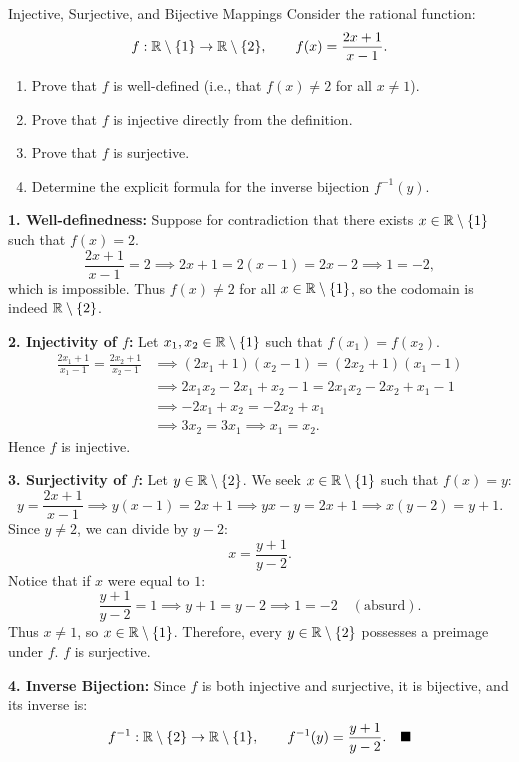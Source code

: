 \begin{exercise}{Injective, Surjective, and Bijective Mappings}
Consider the rational function:
\[
f: \mathbb{R} \setminus \{1\} \to \mathbb{R} \setminus \{2\}, \qquad f(x) = \frac{2x + 1}{x - 1}.
\]
\begin{enumerate}[leftmargin=1.5em,itemsep=2pt]
  \item Prove that $f$ is well-defined (i.e., that $f(x) \ne 2$ for all $x \ne 1$).
  \item Prove that $f$ is injective directly from the definition.
  \item Prove that $f$ is surjective.
  \item Determine the explicit formula for the inverse bijection $f^{-1}(y)$.
\end{enumerate}
\end{exercise}

\begin{tabletworkspace}[5.0cm]
\end{tabletworkspace}

\begin{solution}
\textbf{1. Well-definedness:}
Suppose for contradiction that there exists $x \in \mathbb{R} \setminus \{1\}$ such that $f(x) = 2$.
\[
\frac{2x + 1}{x - 1} = 2 \implies 2x + 1 = 2(x - 1) = 2x - 2 \implies 1 = -2,
\]
which is impossible. Thus $f(x) \ne 2$ for all $x \in \mathbb{R} \setminus \{1\}$, so the codomain is indeed $\mathbb{R} \setminus \{2\}$.

\textbf{2. Injectivity of $f$:}
Let $x_1, x_2 \in \mathbb{R} \setminus \{1\}$ such that $f(x_1) = f(x_2)$.
\begin{align*}
\frac{2x_1 + 1}{x_1 - 1} = \frac{2x_2 + 1}{x_2 - 1} &\implies (2x_1 + 1)(x_2 - 1) = (2x_2 + 1)(x_1 - 1) \\
&\implies 2x_1 x_2 - 2x_1 + x_2 - 1 = 2x_1 x_2 - 2x_2 + x_1 - 1 \\
&\implies -2x_1 + x_2 = -2x_2 + x_1 \\
&\implies 3x_2 = 3x_1 \implies x_1 = x_2.
\end{align*}
Hence $f$ is injective.

\textbf{3. Surjectivity of $f$:}
Let $y \in \mathbb{R} \setminus \{2\}$. We seek $x \in \mathbb{R} \setminus \{1\}$ such that $f(x) = y$:
\[
y = \frac{2x + 1}{x - 1} \implies y(x - 1) = 2x + 1 \implies yx - y = 2x + 1 \implies x(y - 2) = y + 1.
\]
Since $y \ne 2$, we can divide by $y - 2$:
\[
x = \frac{y + 1}{y - 2}.
\]
Notice that if $x$ were equal to $1$:
\[
\frac{y + 1}{y - 2} = 1 \implies y + 1 = y - 2 \implies 1 = -2 \quad (\text{absurd}).
\]
Thus $x \ne 1$, so $x \in \mathbb{R} \setminus \{1\}$.
Therefore, every $y \in \mathbb{R} \setminus \{2\}$ possesses a preimage under $f$. $f$ is surjective.

\textbf{4. Inverse Bijection:}
Since $f$ is both injective and surjective, it is bijective, and its inverse is:
\[
f^{-1}: \mathbb{R} \setminus \{2\} \to \mathbb{R} \setminus \{1\}, \qquad f^{-1}(y) = \frac{y + 1}{y - 2}. \quad \blacksquare
\]
\end{solution}


